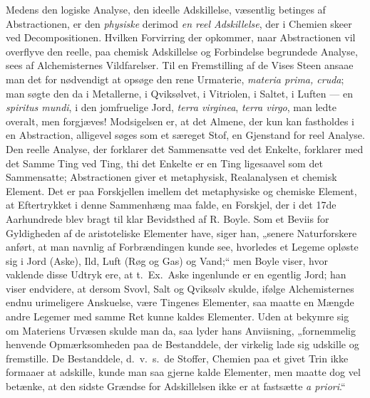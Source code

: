 \documentclass[12pt,a4paper]{book}
\begin{document}
Medens den logiske Analyse, den ideelle Adskillelse, væsentlig
betinges af Abstractionen, er den \emph{physiske} derimod
\emph{en reel Adskillelse}, der i Chemien skeer ved Decompositionen.
Hvilken Forvirring der opkommer, naar Abstractionen vil overflyve
den reelle, paa chemisk Adskillelse og Forbindelse begrundede
Analyse, sees af Alchemisternes Vildfarelser. Til en
Fremstilling af de Vises Steen ansaae man det for nødvendigt at
opsøge den rene Urmaterie, \textit{materia prima, cruda}; man
søgte den da i Metallerne, i Qviksølvet, i Vitriolen, i Saltet,
i Luften --- en \textit{spiritus mundi}, i den jomfruelige Jord,
\textit{terra virginea}, \textit{terra virgo}, man ledte overalt, men
forgjæves! Modsigelsen er, at det Almene, der kun kan fastholdes i en
Abstraction, alligevel søges som et særeget Stof, en Gjenstand
for reel Analyse. Den reelle Analyse, der forklarer
det Sammensatte ved det Enkelte, forklarer med det Samme
Ting ved Ting, thi det Enkelte er en Ting ligesaavel som
det Sammensatte; Abstractionen giver et metaphysisk, Realanalysen
et chemisk Element. Det er paa Forskjellen imellem
det metaphysiske og chemiske Element, at Eftertrykket i denne
Sammenhæng maa falde, en Forskjel, der i det 17de Aarhundrede
blev bragt til klar Bevidsthed af R. Boyle. Som
et Beviis for Gyldigheden af de aristoteliske Elementer have,
siger han, „senere Naturforskere anført, at man navnlig af
Forbrændingen kunde see, hvorledes et Legeme opløste sig i
Jord (Aske), Ild, Luft (Røg og Gas) og Vand;“ men Boyle
viser, hvor vaklende disse Udtryk ere, at t.\ Ex.\ Aske ingenlunde
er en egentlig Jord; han viser endvidere, at dersom
Svovl, Salt og Qviksølv skulde, ifølge Alchemisternes endnu
urimeligere Anskuelse, være Tingenes Elementer, saa maatte
en Mængde andre Legemer med samme Ret kunne kaldes
Elementer. Uden at bekymre sig om Materiens Urvæsen
skulde man da, saa lyder hans Anviisning, „fornemmelig
henvende Opmærksomheden paa de Bestanddele, der virkelig
lade sig udskille og fremstille. De Bestanddele, d.\ v.\ s.\ de Stoffer,
Chemien paa et givet Trin ikke formaaer at adskille, kunde man
saa gjerne kalde Elementer, men maatte dog vel betænke, at
den sidste Grændse for Adskillelsen ikke er at fastsætte
\textit{a priori}.“
\end{document}
